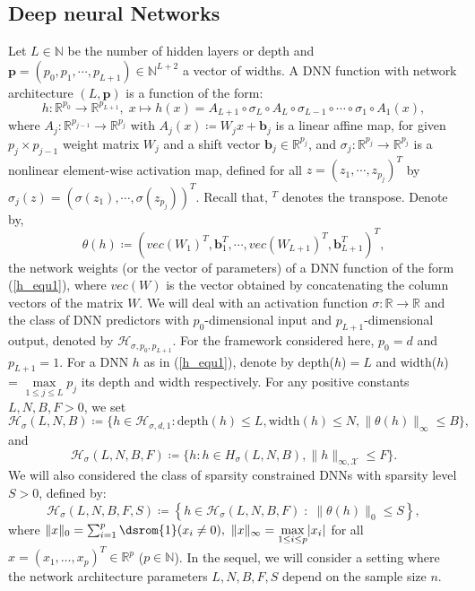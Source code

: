 \documentclass[10pt,twoside]{article}
\numberwithin{equation}{section}
\newcommand{\R}{\ensuremath{\mathbb{R}}}
\newcommand{\N}{\ensuremath{\mathbb{N}}}
\def \ind{\textrm{\dsrom{1}}}
\begin{document}
\subsection{ Deep neural Networks }\label{Def_DNNs}
%
Let $L \in \N$ be the number of hidden layers or depth and $\mathbf{p} = (p_0, p_1,\cdots, p_{L+1}) \in \N^{L+2}$ a vector of widths. 
%
A DNN function with network architecture $ (L, \textbf{p}) $ is a function of the form:
%
\begin{equation}\label{h_equ1}
h: \R^{p_0} \rightarrow \R^{p_{L+1}}, \;   x\mapsto h(x) = A_{L+1} \circ \sigma_{L} \circ A_{L} \circ \sigma_{L-1} \circ \cdots \circ \sigma_1 \circ A_1 (x),
\end{equation} 
%
where $ A_j: \R^ {p_ {j -1}} \rightarrow \R^ {p_j} $ with $A_j (x) \coloneqq W_j x + \textbf{b}_j$ is a linear affine map, for given  $p_ {j}\times p_{j-1}$  weight matrix $ W_j$   and a shift vector $ \textbf{b}_j \in \R^ {p_j} $, and $\sigma_j: \R^{p_j} \rightarrow \R^ {p_j} $ is a nonlinear element-wise activation map, defined for all $z=(z_1,\cdots,z_{p_j})^T$ by $\sigma_j (z) = (\sigma(z_1), \cdots, \sigma(z_{p_j}))^{T} $.
Recall that, $^T$ denotes the transpose.   
%
Denote by,
%
\begin{equation} \label{def_theta_h}
\theta(h) \coloneqq \left(vec(W_1)^ {T}, \textbf{b}^{T}_{1}, \cdots,  vec(W_{L + 1})^{T} , \textbf{b}^ {T}_{L+1} \right)^{T}, 
 \end{equation} 
%
the network weights (or the vector of parameters) of a DNN function of the form (\ref{h_equ1}), where $ vec(W)$ is the vector obtained by concatenating the column vectors of the matrix $W$. 
 We will deal with an activation function $ \sigma: \R \rightarrow \R$ and the class of DNN predictors with $p_0$-dimensional input and $p_{L+1} $-dimensional output, denoted by $\mathcal{H}_{\sigma, p_0, p_{L+1}} $.
For the framework considered here, $p_0 = d$ and $p_ {L + 1} = 1$.
%
For a DNN $h$ as in (\ref{h_equ1}), denote by depth($h$)$=L$ and  width($h$) = $\underset{1\leq j \leq L} {\max} p_j $ its depth and width respectively. For any positive constants $L, N, B, F > 0$, we set
%
\[ \mathcal{H}_{\sigma}(L, N, B) \coloneqq \big \{h\in \mathcal{H}_{\sigma, d, 1}: \text{depth}(h)\leq L, \text{width}(h)\leq N, \|\theta(h)\|_{\infty} \leq B \big\},  \]
%
 and
\begin{equation}\label{DNNs_no_Constraint}
\mathcal{H}_{\sigma}(L, N, B, F) \coloneqq \big\{ h: h\in H_{\sigma}(L, N, B), \| h \|_{\infty, \mathcal{X}} \leq F \big\}. 
\end{equation}
%
We will also considered the class of sparsity constrained DNNs with sparsity level $S > 0$, defined by: 
%
\begin{equation}\label{DNNs_Constraint}
\mathcal{H}_{\sigma}(L, N, B, F, S) \coloneqq \left\{h\in \mathcal{H}_{\sigma}(L, N, B, F) \; :  \; \| \theta(h) \|_0 \leq S 
  \right\},
\end{equation}
% 
%
where $\| x \|_0 = \sum_{i=1}^p \ind(x_i \neq 0), ~ \| x\|_{\infty} = \underset{1 \leq i  \leq p}{\max} |x_i |$ for all $x=(x_1,\ldots,x_p)^{T} \in \R^p$ ($p \in \N$).
%
In the sequel, we will consider a setting where the network architecture parameters $L, N, B, F, S$ depend on the sample size $n$.
\end{document}
